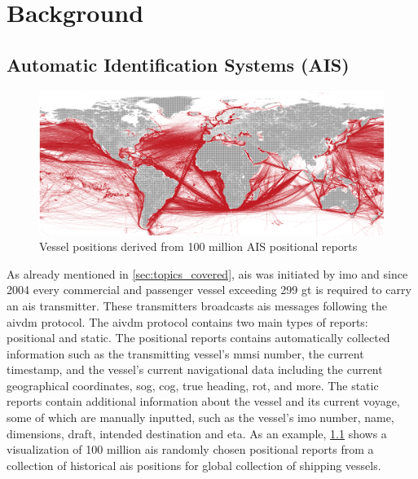 \chapter{Background}

\section{Automatic Identification Systems (AIS)}

\begin{figure}[htbp]  %
    \centering
    \includegraphics[width=1.0\textwidth]{figures/ais_history}
    \caption{Vessel positions derived from 100 million AIS positional reports}
    \label{fig:ais_positions}
\end{figure}

As already mentioned in \cref{sec:topics_covered}, \acrfull{ais} was initiated by \acrfull{imo} and since 2004 every commercial and passenger vessel exceeding 299 \acrfull{gt} is required to carry an \acrshort{ais} transmitter. These transmitters broadcasts \acrshort{ais} messages following the \gls{aivdm} protocol. The \gls{aivdm} protocol contains two main types of reports: positional and static. The positional reports contains automatically collected information such as the transmitting vessel's \acrfull{mmsi} number, the current timestamp, and the vessel's current navigational data including the current geographical coordinates, \acrfull{sog}, \acrfull{cog}, true heading, \acrfull{rot}, and more. The static reports contain additional information about the vessel and its current voyage, some of which are manually inputted, such as the vessel's \acrshort{imo} number, name, dimensions, draft, intended destination and \acrfull{eta}. As an example, \cref{fig:ais_positions} shows a visualization of 100 million \acrshort{ais} randomly chosen positional reports from a collection of historical \acrshort{ais} positions for global collection of shipping vessels.

